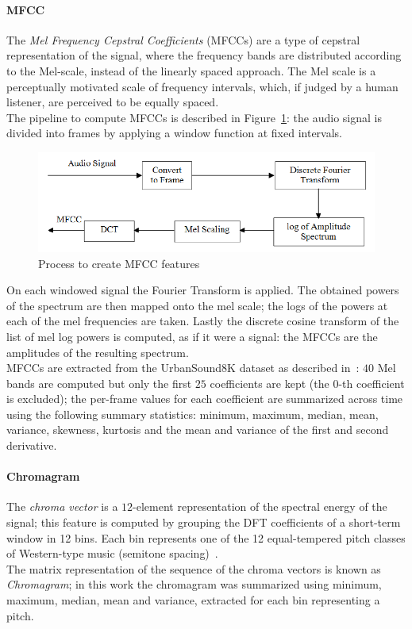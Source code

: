 \documentclass[oneside,openany]{article}
\begin{document}
    \paragraph{MFCC}
    The \textit{Mel Frequency Cepstral Coefficients} (MFCCs) are a type of cepstral representation of the signal, where the frequency bands are distributed according to the Mel-scale, instead of the linearly spaced approach. The Mel scale is a perceptually motivated scale of frequency intervals, which, if judged by a human listener, are perceived to be equally spaced.\\
    The pipeline to compute MFCCs is described in Figure~\ref{fig:mfcc_pipeline}: the audio signal is divided into frames by applying a window function at fixed intervals.\\ 
    \begin{figure}[h]
    \includegraphics[width=\columnwidth]{mfcc_pipeline.png}
    \caption{Process to create MFCC features}
    \label{fig:mfcc_pipeline}
    \end{figure}
    On each windowed signal the Fourier Transform is applied.
    The obtained powers of the spectrum are then mapped onto the mel scale; the logs of the powers at each of the mel frequencies are taken. Lastly the discrete cosine transform of the list of mel log powers is computed, as if it were a signal: the MFCCs are the amplitudes of the resulting spectrum.\\
    MFCCs are extracted from the UrbanSound8K dataset as described in~\cite{salamon2014dataset}: $40$ Mel bands are computed but only the first $25$ coefficients are kept (the $0$-th coefficient is excluded); the per-frame values for each coefficient are summarized across time using the following summary statistics: minimum, maximum, median, mean, variance, skewness, kurtosis and the mean and variance of the first and second derivative.
    
    \paragraph{Chromagram}
    The \textit{chroma vector} is a $12$-element representation of the spectral energy of the signal; this feature is computed by grouping the DFT coefficients of a short-term window in 12 bins. Each bin represents one of the 12 equal-tempered pitch classes of Western-type music (semitone spacing)~\cite{chroma}.\\
    The matrix representation of the sequence of the chroma vectors is known as \textit{Chromagram}; in this work the chromagram was summarized using minimum, maximum, median, mean and variance, extracted for each bin representing a pitch.
    
\end{document}

